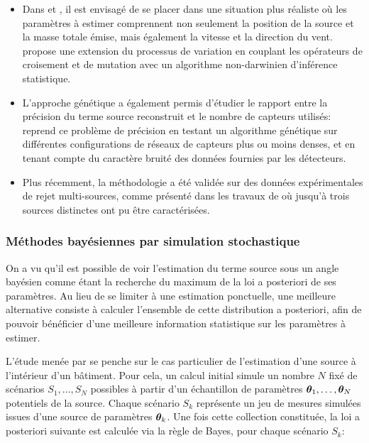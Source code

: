  \begin{itemize}
 	\item Dans \cite{Allen2007} et \cite{Haupt2007}, il est envisagé de se placer dans une situation plus réaliste où les paramètres à estimer comprennent non seulement la position de la source et la masse totale émise, mais également la vitesse et la direction du vent. \cite{Cervone2011} propose une extension du processus de variation en couplant les opérateurs de croisement et de mutation avec un algorithme non-darwinien d'inférence statistique.
 \item L'approche génétique a également permis d'étudier le rapport entre la précision du terme source reconstruit et le nombre de capteurs utilisés: \cite{Long2010} reprend ce problème de précision en testant un algorithme génétique sur différentes configurations de réseaux de capteurs plus ou moins denses, et en tenant compte du caractère bruité des données fournies par les détecteurs. 
 \item Plus récemment, la méthodologie a été validée sur des données expérimentales de rejet multi-sources, comme présenté dans les travaux de \cite{Cantelli2015} où jusqu'à trois sources distinctes ont pu être caractérisées.\\
 \end{itemize}
 
 \subsubsection{Méthodes bayésiennes par simulation stochastique}
 
 On a vu qu'il est possible de voir l'estimation du terme source sous un angle bayésien  comme étant la recherche du maximum  de la loi a posteriori de ses paramètres. Au lieu de se limiter à une estimation ponctuelle, une meilleure alternative consiste à calculer l'ensemble de cette distribution a posteriori, afin de pouvoir bénéficier d'une meilleure information statistique sur les paramètres à estimer. 
 
 L'étude menée par \cite{Sohn2002} se penche sur le cas particulier de l'estimation d'une source à l'intérieur d'un bâtiment. Pour cela, un calcul initial simule un nombre $N$ fixé de scénarios $S_1,\dots,S_N$ possibles à partir d'un échantillon de paramètres ${\bm{\theta}}_1, \dots, {\bm{\theta}}_N$ potentiels de la source. Chaque scénario $S_k$ représente un jeu de mesures simulées issues d'une source de paramètres ${\bm{\theta}}_k$. Une fois cette collection constituée, la loi a posteriori suivante est calculée via la règle de Bayes, pour chaque scénario $S_k$:
 
